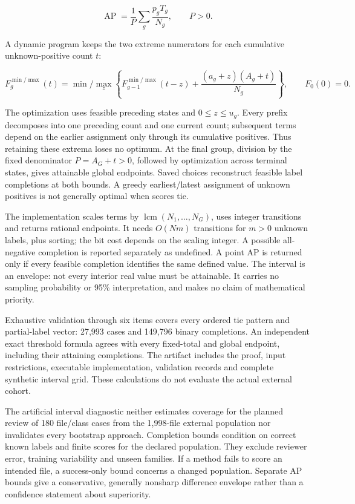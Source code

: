 \documentclass[preprint,12pt]{elsarticle}
\begin{document}
\[
\operatorname{AP}=\frac{1}{P}\sum_g\frac{p_gT_g}{N_g},\qquad P>0.
\]

A dynamic program keeps the two extreme numerators for each cumulative unknown-positive count \(t\):

\[
F_g^{\min/\max}(t)=\min/\max_z\left\{
F_{g-1}^{\min/\max}(t-z)+\frac{(a_g+z)(A_g+t)}{N_g}
\right\},\qquad F_0(0)=0.
\]

The optimization uses feasible preceding states and \(0\le z\le u_g\). Every prefix decomposes into one preceding count and one current count; subsequent terms depend on the earlier assignment only through its cumulative positives. Thus retaining these extrema loses no optimum. At the final group, division by the fixed denominator \(P=A_G+t>0\), followed by optimization across terminal states, gives attainable global endpoints. Saved choices reconstruct feasible label completions at both bounds. A greedy earliest/latest assignment of unknown positives is not generally optimal when scores tie.

The implementation scales terms by \(\operatorname{lcm}(N_1,\ldots,N_G)\), uses integer transitions and returns rational endpoints. It needs \(O(Nm)\) transitions for \(m>0\) unknown labels, plus sorting; the bit cost depends on the scaling integer. A possible all-negative completion is reported separately as undefined. A point AP is returned only if every feasible completion identifies the same defined value. The interval is an envelope: not every interior real value must be attainable. It carries no sampling probability or 95\% interpretation, and makes no claim of mathematical priority.

Exhaustive validation through six items covers every ordered tie pattern and partial-label vector: 27,993 cases and 149,796 binary completions. An independent exact threshold formula agrees with every fixed-total and global endpoint, including their attaining completions. The artifact includes the proof, input restrictions, executable implementation, validation records and complete synthetic interval grid. These calculations do not evaluate the actual external cohort.

The artificial interval diagnostic neither estimates coverage for the planned review of 180 file/class cases from the 1,998-file external population nor invalidates every bootstrap approach. Completion bounds condition on correct known labels and finite scores for the declared population. They exclude reviewer error, training variability and unseen families. If a method fails to score an intended file, a success-only bound concerns a changed population. Separate AP bounds give a conservative, generally nonsharp difference envelope rather than a confidence statement about superiority.
\end{document}
